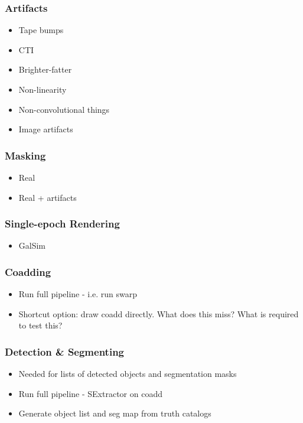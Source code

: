\documentclass[\docopts]{\docclass}
\begin{document}
\subsubsection{Artifacts}
\begin{itemize}
\item Tape bumps
\item CTI
\item Brighter-fatter
\item Non-linearity
\item Non-convolutional things
\item Image artifacts
\end{itemize}

\subsubsection{Masking}

\begin{itemize}
\item Real
\item Real + artifacts
\end{itemize}

\subsubsection{Single-epoch Rendering}

\begin{itemize}
\item GalSim
\end{itemize}

\subsubsection{Coadding}
\begin{itemize}
\item Run full pipeline - i.e. run swarp
\item Shortcut option: draw coadd directly. What does this miss? What is required to test this?
\end{itemize}

\subsubsection{Detection \& Segmenting}
\begin{itemize}
\item Needed for lists of detected objects and segmentation masks
\item Run full pipeline - SExtractor on coadd
\item Generate object list and seg map from truth catalogs
\end{itemize}
\end{document}
